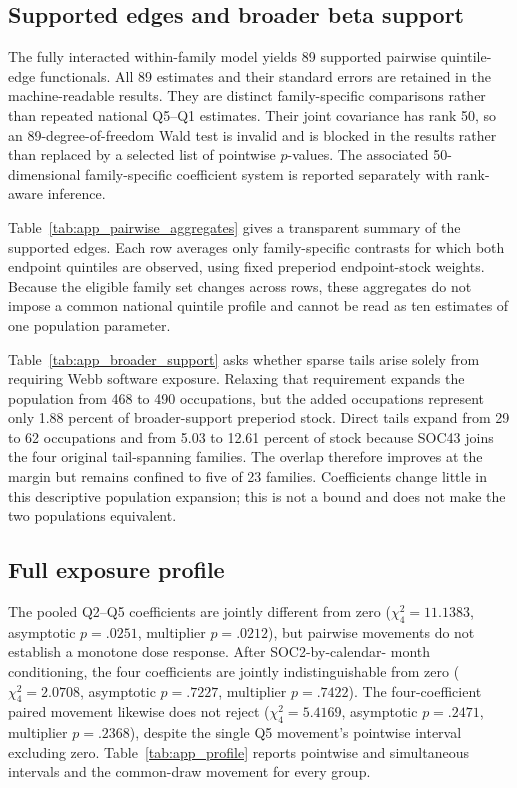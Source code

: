 

\subsection{Supported edges and broader beta support}

The fully interacted within-family model yields 89 supported pairwise
quintile-edge functionals.  All 89 estimates and their standard errors are
retained in the machine-readable results.  They are distinct family-specific
comparisons rather than repeated national Q5--Q1 estimates.  Their joint
covariance has rank 50, so an 89-degree-of-freedom Wald test is invalid and is
blocked in the results rather than replaced by a selected list of pointwise
$p$-values.  The associated 50-dimensional family-specific coefficient system
is reported separately with rank-aware inference.

Table~\ref{tab:app_pairwise_aggregates} gives a transparent summary of the
supported edges.  Each row averages only family-specific contrasts for which
both endpoint quintiles are observed, using fixed preperiod endpoint-stock
weights.  Because the eligible family set changes across rows, these
aggregates do not impose a common national quintile profile and cannot be read
as ten estimates of one population parameter.



Table~\ref{tab:app_broader_support} asks whether sparse tails arise solely from
requiring Webb software exposure.  Relaxing that requirement expands the
population from 468 to 490 occupations, but the added occupations represent
only 1.88 percent of broader-support preperiod stock.  Direct tails expand from
29 to 62 occupations and from 5.03 to 12.61 percent of stock because SOC43
joins the four original tail-spanning families.  The overlap therefore improves
at the margin but remains confined to five of 23 families.  Coefficients change
little in this descriptive population expansion; this is not a bound and does
not make the two populations equivalent.



\subsection{Full exposure profile}

The pooled Q2--Q5 coefficients are jointly different from zero
($\chi^2_4=11.1383$, asymptotic $p=.0251$, multiplier $p=.0212$), but pairwise
movements do not establish a monotone dose response.  After SOC2-by-calendar-
month conditioning, the four coefficients are jointly indistinguishable from
zero ($\chi^2_4=2.0708$, asymptotic $p=.7227$, multiplier $p=.7422$).  The
four-coefficient paired movement likewise does not reject
($\chi^2_4=5.4169$, asymptotic $p=.2471$, multiplier $p=.2368$), despite the
single Q5 movement's pointwise interval excluding zero.  Table~\ref{tab:app_profile}
reports pointwise and simultaneous intervals and the common-draw movement for
every group.

